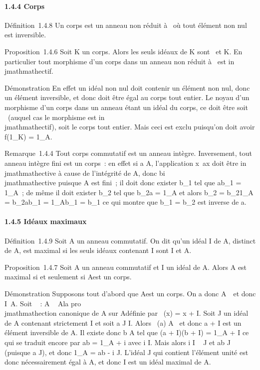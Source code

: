 \paragraph{1.4.4 Corps}

Définition~1.4.8 Un corps est un anneau non réduit à
\0\ où tout élément non nul est
inversible.

Proposition~1.4.6 Soit K un corps. Alors les seuls idéaux de K sont
\0\ et K. En particulier tout
morphisme d'un corps dans un anneau non réduit à
\0\ est in\\jmathmathectif.

Démonstration En effet un idéal non nul doit contenir un élément non
nul, donc un élément inversible, et donc doit être égal au corps tout
entier. Le noyau d'un morphisme d'un corps dans un anneau étant un idéal
du corps, ce doit être soit \0\
(auquel cas le morphisme est in\\jmathmathectif), soit le corps tout entier. Mais
ceci est exclu puisqu'on doit avoir f(1_K) = 1_A.

Remarque~1.4.4 Tout corps commutatif est un anneau intègre. Inversement,
tout anneau intègre fini est un corps~: en effet si a \in A, l'application
x\mapsto~ax doit être in\\jmathmathective à cause de
l'intégrité de A, donc bi\\jmathmathective puisque A est fini~; il doit donc
exister b_1 tel que ab_1 = 1_A~; de même il
doit exister b_2 tel que b_2a = 1_A et alors
b_2 = b_21_A = b_2ab_1 =
1_Ab_1 = b_1 ce qui montre que b_1 =
b_2 est inverse de a.

\paragraph{1.4.5 Idéaux maximaux}

Définition~1.4.9 Soit A un anneau commutatif. On dit qu'un idéal I de A,
distinct de A, est maximal si les seuls idéaux contenant I sont I et A.

Proposition~1.4.7 Soit A un anneau commutatif et I un idéal de A. Alors
A est maximal si et seulement si A\diagupI est un corps.

Démonstration Supposons tout d'abord que A\diagupI est un corps. On a donc
A\diagupI\neq~\0\ et
donc I\neq~A. Soit \pi~ : A \rightarrow~ A\diagupI la pro\\jmathmathection
canonique de A sur A\diagupI définie par \pi~(x) = x + I. Soit J un idéal de A
contenant strictement I et soit a \in J \diagdown I. Alors \pi~(a) \in A\diagupI
\diagdown\0\ et donc a + I est un élément
inversible de A\diagupI. Il existe donc b \in A tel que (a + I)(b + I) =
1_A + I ce qui se traduit encore par ab = 1_A + i avec
i \in I. Mais alors i \in I \subset~ J et ab \in J (puisque a \in J), et donc
1_A = ab - i \in J. L'idéal J qui contient l'élément unité est
donc nécessairement égal à A, et donc I est un idéal maximal de A.

